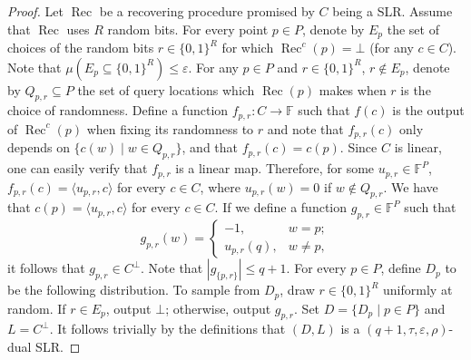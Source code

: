 \documentclass[10pt,a4paper]{article}
\begin{document}
\begin{proof}
Let $\operatorname{Rec}$ be a recovering procedure promised by $C$ being a SLR. Assume that $\operatorname{Rec}$ uses $R$ random bits. For every point $p\in P$, denote by $E_p$ the set of choices of the random bits $r\in\{0,1\}^R$ for which $\operatorname{Rec}^c(p)=\bot$ (for any $c\in C$). Note that $\mu(E_p\subseteq\{0,1\}^R)\leq\varepsilon$.
For any $p\in P$ and $r\in\{0,1\}^R$, $r\notin E_p$, denote by $Q_{p,r}\subseteq P$ the set of query locations which $\operatorname{Rec}(p)$ makes when $r$ is the choice of randomness. Define a function $f_{p,r}:C\to\mathbb F$ such that $f(c)$ is the output of $\operatorname{Rec}^c(p)$ when fixing its randomness to $r$ and note that $f_{p,r}(c)$ only depends on $\{c(w)\mid w\in Q_{p,r}\}$, and that $f_{p,r}(c)=c(p)$. Since $C$ is linear, one can easily verify that $f_{p,r}$ is a linear map. Therefore, for some $u_{p,r}\in\mathbb F^P$, $f_{p,r}(c)=\langle u_{p,r},c\rangle$ for every $c\in C$, where $u_{p,r}(w)=0$ if $w\notin Q_{p,r}$. We have that $c(p)=\langle u_{p,r},c\rangle$ for every $c\in C$. If we define a function $g_{p,r}\in\mathbb F^P$ such that
\[g_{p,r}(w)=\begin{cases}-1,&w=p;\\u_{p,r}(q),&w\ne p,\end{cases}\]
it follows that $g_{p,r}\in C^\perp$. Note that $|g_{\{p,r\}}|\leq q+1$.
For every $p\in P$, define $D_p$ to be the following distribution. To sample from $D_p$, draw $r\in\{0,1\}^R$ uniformly at random. If $r\in E_p$, output $\bot$; otherwise, output $g_{p,r}$. Set $D=\{D_p\mid p\in P\}$ and $L=C^\perp$. It follows trivially by the definitions that $(D,L)$ is a $(q+1,\tau,\varepsilon,\rho)$-dual SLR.
\end{proof}
\end{document}

